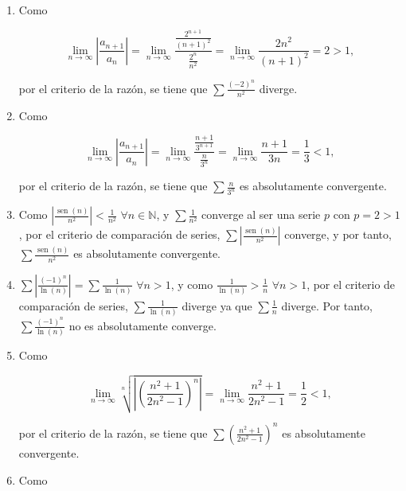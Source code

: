 \documentclass[
  spanish,
  a4paper,
]{scrreport}
\theoremstyle{definition}
\theoremstyle{remark}
\begin{document}
\begin{tcolorbox}[enhanced jigsaw, arc=.35mm, bottomrule=.15mm, bottomtitle=1mm, breakable, colback=white, colbacktitle=quarto-callout-tip-color!10!white, colframe=quarto-callout-tip-color-frame, coltitle=black, left=2mm, leftrule=.75mm, opacityback=0, opacitybacktitle=0.6, rightrule=.15mm, title=\textcolor{quarto-callout-tip-color}{\faLightbulb}\hspace{0.5em}{Solución}, titlerule=0mm, toprule=.15mm, toptitle=1mm]

\begin{enumerate}
\def\labelenumi{\alph{enumi}.}
\item
  Como

  \[
   \lim_{n\to\infty} \left|\frac{a_{n+1}}{a_n}\right| = \lim_{n\to\infty} \frac{\frac{2^{n+1}}{(n+1)^2}}{\frac{2^n}{n^2}} = \lim_{n\to\infty}\frac{2n^2}{(n+1)^2} = 2 >1,
   \]

  por el criterio de la razón, se tiene que \(\sum \frac{(-2)^n}{n^2}\)
  diverge.
\item
  Como

  \[
   \lim_{n\to\infty} \left|\frac{a_{n+1}}{a_n}\right| = \lim_{n\to\infty} \frac{\frac{n+1}{3^{n+1}}}{\frac{n}{3^n}} = \lim_{n\to\infty}\frac{n+1}{3n} = \frac{1}{3} <1,
   \]

  por el criterio de la razón, se tiene que \(\sum \frac{n}{3^n}\) es
  absolutamente convergente.
\item
  Como \(\left|\frac{\operatorname{sen}(n)}{n^2}\right|< \frac{1}{n^2}\)
  \(\forall n\in\mathbb{N}\), y \(\sum \frac{1}{n^2}\) converge al ser
  una serie \(p\) con \(p=2>1\), por el criterio de comparación de
  series, \(\sum \left|\frac{\operatorname{sen}(n)}{n^2}\right|\)
  converge, y por tanto, \(\sum \frac{\operatorname{sen}(n)}{n^2}\) es
  absolutamente convergente.
\item
  \(\sum \left|\frac{(-1)^n}{\ln(n)}\right|= \sum \frac{1}{\ln(n)}\)
  \(\forall n>1\), y como \(\frac{1}{\ln(n)}>\frac{1}{n}\)
  \(\forall n>1\), por el criterio de comparación de series,
  \(\sum \frac{1}{\ln(n)}\) diverge ya que \(\sum \frac{1}{n}\) diverge.
  Por tanto, \(\sum \frac{(-1)^n}{\ln(n)}\) no es absolutamente
  converge.
\item
  Como

  \[
   \lim_{n\to\infty} \sqrt[n]{\left|\left(\frac{n^2+1}{2n^2-1}\right)^n\right|} = \lim_{n\to\infty} \frac{n^2+1}{2n^2-1} = \frac{1}{2}<1,
   \]

  por el criterio de la razón, se tiene que
  \(\sum \left(\frac{n^2+1}{2n^2-1}\right)^n\) es absolutamente
  convergente.
\item
  Como


\end{enumerate}
\end{tcolorbox}
\end{document}
